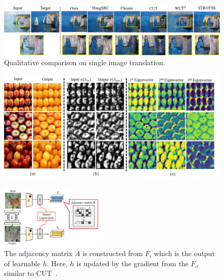 \documentclass[letterpaper]{article} %
\begin{document}
\begin{figure}[!t]
\centering
\includegraphics[width=0.9\linewidth]{figs/single2.png}
\caption{Qualitative comparison on single image translation.}
\label{fig:single}
\end{figure}







\begin{figure}[t]
\centering
\includegraphics[width=0.85\linewidth]{figs/analy_21.jpg}
\label{fig:analy}
\end{figure}

\begin{figure}[!t]
\centering
\includegraphics[width=0.6120000000000001\linewidth,height=1.18in ]{figs/adj_FC_h.jpg}
\caption{The adjacency matrix $A$ is constructed from $F_i$ which is the output of learnable $h$. Here, $h$ is updated by the gradient from the $F_o$ similar to CUT~\cite{cut}. }
\label{fig:adj_FC}
\end{figure}
\end{document}
